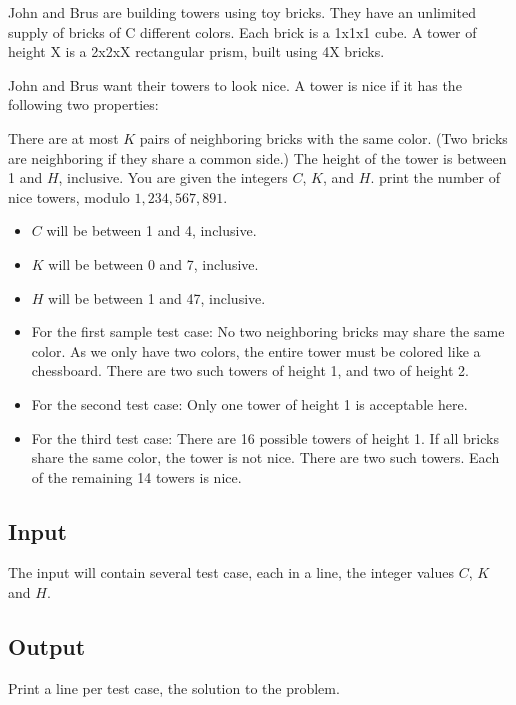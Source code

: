 John and Brus are building towers using toy bricks. They have an unlimited supply of bricks of C different colors. Each brick is a 1x1x1 cube. A tower of height X is a 2x2xX rectangular prism, built using 4X bricks.

John and Brus want their towers to look nice. A tower is nice if it has the following two properties:

There are at most $K$ pairs of neighboring bricks with the same color. (Two bricks are neighboring if they share a common side.)
The height of the tower is between 1 and $H$, inclusive.
You are given the integers $C$, $K$, and $H$. print the number of nice towers, modulo $1,234,567,891$.

\begin{itemize}	
  \item $C$ will be between 1 and 4, inclusive.
  \item $K$ will be between 0 and 7, inclusive.
  \item $H$ will be between 1 and 47, inclusive.

  \item For the first sample test case: No two neighboring bricks may share the same color. As we only have two colors, the entire tower must be colored like a chessboard. There are two such towers of height 1, and two of height 2.
\item For the second test case: Only one tower of height 1 is acceptable here.
\item For the third test case: There are 16 possible towers of height 1. If all bricks share the same color, the tower is not nice. There are two such towers. Each of the remaining 14 towers is nice.

\end{itemize} 

\subsection* {Input}

The input will contain several test case, each in a line, the integer values $C$, $K$ and $H$.

\subsection* {Output}

Print a line per test case, the solution to the problem.

\outputnotice

